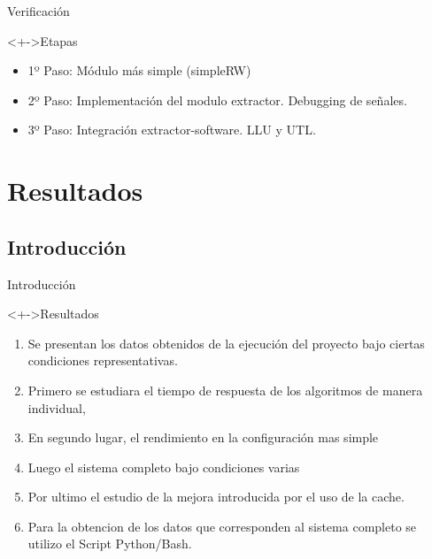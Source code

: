 \documentclass[xcolor=dvipsnames]{beamer}
\begin{document}
\begin{frame}{Verificación}
\begin{block}<+->{Etapas}   
    \begin{itemize}
      \scriptsize
     	\item 1º Paso: Módulo más simple (simpleRW)
     	\item 2º Paso: Implementación del modulo extractor. Debugging de señales.
     	\item 3º Paso: Integración extractor-software. LLU y UTL.
    \end{itemize}
  \end{block}
\end{frame}



\section{Resultados}
\subsection{Introducción}
\begin{frame}{Introducción}
	\begin{block}<+->{Resultados}  
	 \begin{enumerate}	
		\item Se presentan los datos obtenidos de la ejecución del proyecto bajo ciertas condiciones representativas. 
		\item Primero se estudiara el tiempo de respuesta de los algoritmos de manera individual, 
		\item En segundo lugar,  el rendimiento en la configuración mas simple
		\item Luego el sistema completo bajo condiciones varias
		\item Por ultimo el estudio de la mejora introducida por el uso de la cache. 
		\item Para la obtencion de los datos que corresponden al sistema completo se utilizo el Script Python/Bash.
	\end{enumerate}
  \end{block}

\end{frame}
\end{document}
